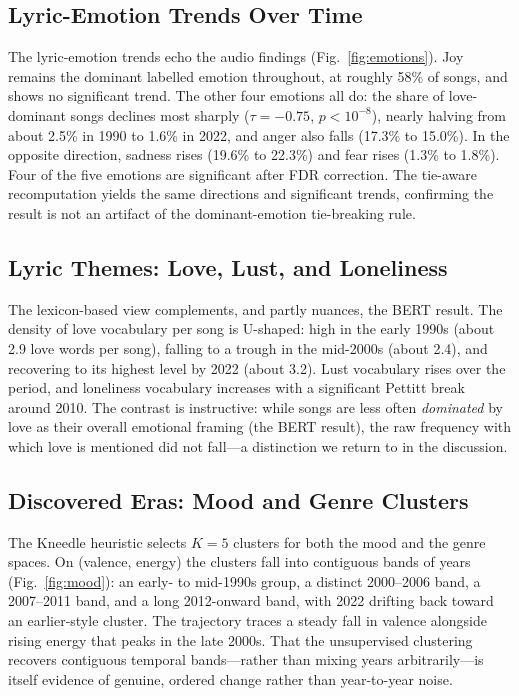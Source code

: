 \documentclass[conference]{IEEEtran}
\begin{document}
\subsection{Lyric-Emotion Trends Over Time}
The lyric-emotion trends echo the audio findings (Fig.~\ref{fig:emotions}). Joy
remains the dominant labelled emotion throughout, at roughly 58\% of songs, and
shows no significant trend. The other four emotions all do: the share of
love-dominant songs declines most sharply ($\tau = -0.75$, $p < 10^{-8}$),
nearly halving from about 2.5\% in 1990 to 1.6\% in 2022, and anger also falls
(17.3\% to 15.0\%). In the opposite direction, sadness rises (19.6\% to 22.3\%)
and fear rises (1.3\% to 1.8\%). Four of the five emotions are significant after
FDR correction. The tie-aware recomputation yields the same directions and
significant trends, confirming the result is not an artifact of the
dominant-emotion tie-breaking rule.

\subsection{Lyric Themes: Love, Lust, and Loneliness}
The lexicon-based view complements, and partly nuances, the BERT result. The
density of love vocabulary per song is U-shaped: high in the early 1990s (about
2.9 love words per song), falling to a trough in the mid-2000s (about 2.4), and
recovering to its highest level by 2022 (about 3.2). Lust vocabulary rises over
the period, and loneliness vocabulary increases with a significant Pettitt break
around 2010. The contrast is instructive: while songs are less often
\emph{dominated} by love as their overall emotional framing (the BERT result),
the raw frequency with which love is mentioned did not fall---a distinction we
return to in the discussion.

\subsection{Discovered Eras: Mood and Genre Clusters}
The Kneedle heuristic selects $K = 5$ clusters for both the mood and the genre
spaces. On (valence, energy) the clusters fall into contiguous bands of years
(Fig.~\ref{fig:mood}): an early- to mid-1990s group, a distinct 2000--2006 band,
a 2007--2011 band, and a long 2012-onward band, with 2022 drifting back toward an
earlier-style cluster. The trajectory traces a steady fall in valence alongside
rising energy that peaks in the late 2000s. That the unsupervised clustering
recovers contiguous temporal bands---rather than mixing years arbitrarily---is
itself evidence of genuine, ordered change rather than year-to-year noise.
\end{document}
